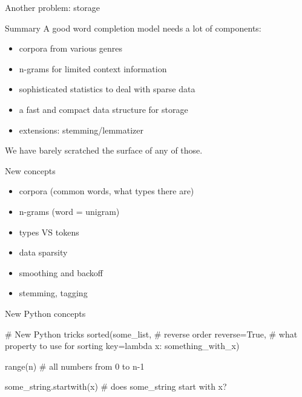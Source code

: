 \documentclass[professionalfonts, xcolor={usenames,svgnames,x11names,table}]{beamer}
\begin{document}
\begin{frame}{Another problem: storage}
\end{frame}

\begin{frame}{Summary}
    A good word completion model needs a lot of components:

    \begin{itemize}
        \item corpora from various genres
        \item n-grams for limited context information
        \item sophisticated statistics to deal with sparse data
        \item a fast and compact data structure for storage
        \item extensions: stemming\slash lemmatizer
    \end{itemize}

    We have barely scratched the surface of any of those.
\end{frame}

\begin{frame}[fragile]{New concepts}
    \begin{itemize}
        \begin{itemize}
            \item corpora (common words, what types there are)
            \item n-grams (word = unigram)
            \item types VS tokens
            \item data sparsity
            \item smoothing and backoff
            \item stemming, tagging
        \end{itemize}
    \end{itemize}
\end{frame}

\begin{frame}[fragile]{New Python concepts}
    \begin{pythoncode}
        # New Python tricks
        sorted(some_list,
               # reverse order
               reverse=True, 
               # what property to use for sorting
               key=lambda x: something_with_x)

        range(n)  # all numbers from 0 to n-1

        some_string.startwith(x)  # does some_string start with x?
    \end{pythoncode}
\end{frame}
\end{document}
